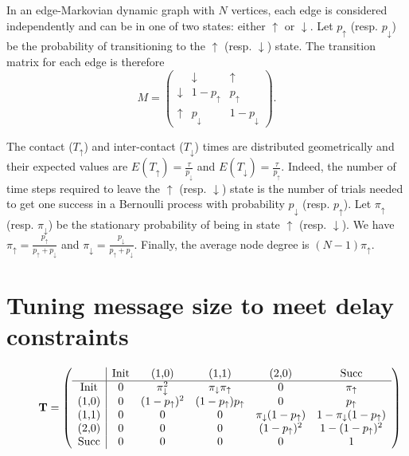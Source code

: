 \documentclass[final,journal,letterpaper]{IEEEtran}
\newcounter{MYtempeqncnt}
\begin{document}
In an edge-Markovian dynamic graph with $N$ vertices, each edge is considered independently and can be in one of two states: either $\uparrow$ or $\downarrow$. Let $p_\uparrow$ (resp. $p_\downarrow$) be the probability of transitioning to the $\uparrow$ (resp. $\downarrow$) state. The transition matrix for each edge is therefore
{\small
\begin{equation}
M = \left( 
\begin{array}{c|cc}
& \downarrow & \uparrow \\
\hline
\downarrow & 1-p_\uparrow & p_\uparrow \\ 
\uparrow & p_\downarrow & 1-p_\downarrow
\end{array}
\right).
\label{eqn:edge_matrix}
\end{equation}
}

The contact ($T_\uparrow$) and inter-contact ($T_\downarrow$) times are distributed geometrically and their expected values are $E(T_\uparrow) = \frac{\tau}{p_\downarrow}$ and $E(T_\downarrow) = \frac{\tau}{p_\uparrow}$. Indeed, the number of time steps required to leave the $\uparrow$ (resp. $\downarrow$) state is the number of trials needed to get one success in a Bernoulli process with probability $p_\downarrow$ (resp. $p_\uparrow$). Let $\pi_\uparrow$ (resp. $\pi_\downarrow$) be the stationary probability of being in state $\uparrow$ (resp. $\downarrow$). We have $\pi_\uparrow = \frac{p_\uparrow}{p_\uparrow+p_\downarrow}$ and $\pi_\downarrow = \frac{p_\downarrow}{p_\uparrow+p_\downarrow}$. Finally, the average node degree is $(N-1)\pi_\uparrow$.


\section{Tuning message size to meet delay constraints}
\label{sec:message_size}

\begin{figure*}[!t]
\normalsize
\setcounter{MYtempeqncnt}{\value{equation}}
\setcounter{equation}{4}
\begin{equation}
\mathbf{T} = \left(
\begin{array}{c|ccccc}
        & $Init$ & $(1,0)$ & $(1,1)$ & $(2,0)$ & $Succ$ \\
\hline
$Init$  & 0 & \pi_\downarrow^2 & \pi_\downarrow \pi_\uparrow & 0 & \pi_\uparrow \\
$(1,0)$ & 0 & (1-p_\uparrow)^2 & (1-p_\uparrow) p_\uparrow & 0 & p_\uparrow \\
$(1,1)$ & 0 & 0 & 0 & \pi_\downarrow (1-p_\uparrow) & 1-\pi_\downarrow (1-p_\uparrow) \\
$(2,0)$ & 0 & 0 & 0 & (1-p_\uparrow)^2 & 1-(1-p_\uparrow)^2 \\ 
$Succ$  & 0 & 0 & 0 & 0 & 1 
\end{array}
\right)
\label{eqn:example}
\end{equation}
\setcounter{equation}{\value{MYtempeqncnt}}
\hrulefill
\vspace*{4pt}
\end{figure*}
\end{document}
